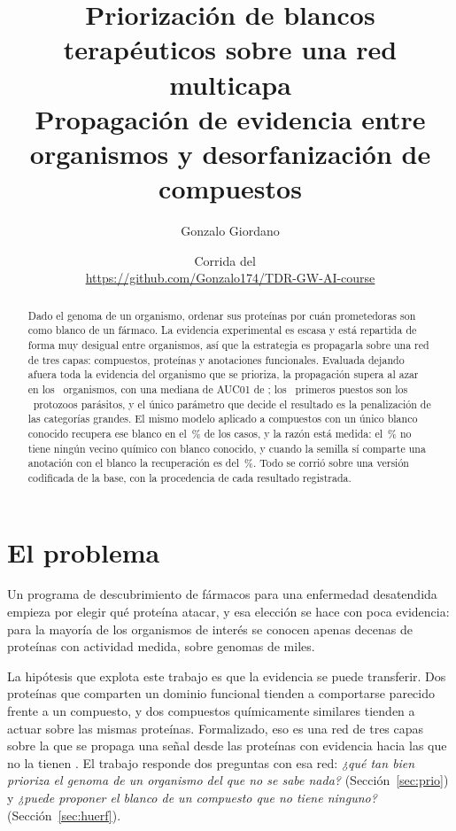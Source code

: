 \documentclass[11pt,a4paper]{article}
\title{\vspace{-1.5cm}Priorización de blancos terapéuticos sobre una red multicapa\\[.3em]
\large Propagación de evidencia entre organismos y desorfanización de compuestos}
\author{Gonzalo Giordano}
\date{Corrida del \FechaCorrida\ \\[.2em]
\small\url{https://github.com/Gonzalo174/TDR-GW-AI-course}}
\begin{document}
\maketitle

\begin{abstract}
\noindent
Dado el genoma de un organismo, ordenar sus proteínas por cuán prometedoras son
como blanco de un fármaco. La evidencia experimental es escasa y está repartida
de forma muy desigual entre organismos, así que la estrategia es propagarla sobre
una red de tres capas: compuestos, proteínas y anotaciones funcionales. Evaluada
dejando afuera toda la evidencia del organismo que se prioriza, la propagación
supera al azar en los \NSobreAzar\ organismos, con una mediana de AUC01 de
\AUCMediana; los \NProtozoosArriba\ primeros puestos son los \NProtozoos\
protozoos parásitos, y el único parámetro que decide el resultado es la
penalización de las categorías grandes. El mismo modelo aplicado a compuestos
con un único blanco conocido recupera ese blanco en el \PctRecuperadas\,\% de los
casos, y la razón está medida: el \PctSinSemilla\,\% no tiene ningún vecino
químico con blanco conocido, y cuando la semilla sí comparte una anotación con el
blanco la recuperación es del \PctRecInformativa\,\%. Todo se corrió sobre una
versión codificada de la base, con la procedencia de cada resultado registrada.
\end{abstract}

\section{El problema}

Un programa de descubrimiento de fármacos para una enfermedad desatendida
empieza por elegir qué proteína atacar, y esa elección se hace con poca
evidencia: para la mayoría de los organismos de interés se conocen apenas
decenas de proteínas con actividad medida, sobre genomas de miles.

La hipótesis que explota este trabajo es que la evidencia se puede transferir.
Dos proteínas que comparten un dominio funcional tienden a comportarse parecido
frente a un compuesto, y dos compuestos químicamente similares tienden a actuar
sobre las mismas proteínas. Formalizado, eso es una red de tres capas sobre la
que se propaga una señal desde las proteínas con evidencia hacia las que no la
tienen \cite{berenstein2016}. El trabajo responde dos preguntas con esa red:
\emph{¿qué tan bien prioriza el genoma de un organismo del que no se sabe nada?}
(Sección~\ref{sec:prio}) y \emph{¿puede proponer el blanco de un compuesto que
no tiene ninguno?} (Sección~\ref{sec:huerf}).
\end{document}
